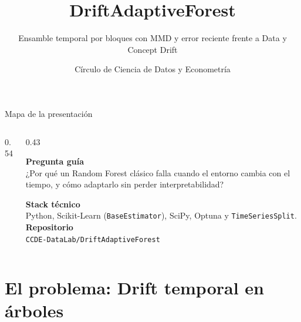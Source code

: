 \documentclass[aspectratio=169,11pt,table]{beamer}
\title{DriftAdaptiveForest}
\subtitle{Ensamble temporal por bloques con MMD y error reciente frente a Data y Concept Drift}
\author{Círculo de Ciencia de Datos y Econometría}
\date{} %
\begin{document}

\begin{frame}{Mapa de la presentación}
\begin{columns}[T,onlytextwidth]
\begin{column}{0.54\textwidth}
{\small\tableofcontents}
\end{column}
\begin{column}{0.43\textwidth}
\begin{keybox}
\textbf{Pregunta guía}\\[0.10cm]
¿Por qué un Random Forest clásico falla cuando el entorno cambia con el tiempo, y cómo adaptarlo sin perder interpretabilidad?
\end{keybox}
\vspace{0.12cm}
\begin{ccdebox}
\scriptsize
\textbf{Stack técnico}\\
Python, Scikit-Learn (\texttt{BaseEstimator}), SciPy, Optuna y \texttt{TimeSeriesSplit}.\\[0.10cm]
\textbf{Repositorio}\\
\texttt{CCDE-DataLab/DriftAdaptiveForest}
\end{ccdebox}
\end{column}
\end{columns}
\end{frame}

\section{El problema: Drift temporal en árboles}
\end{document}
